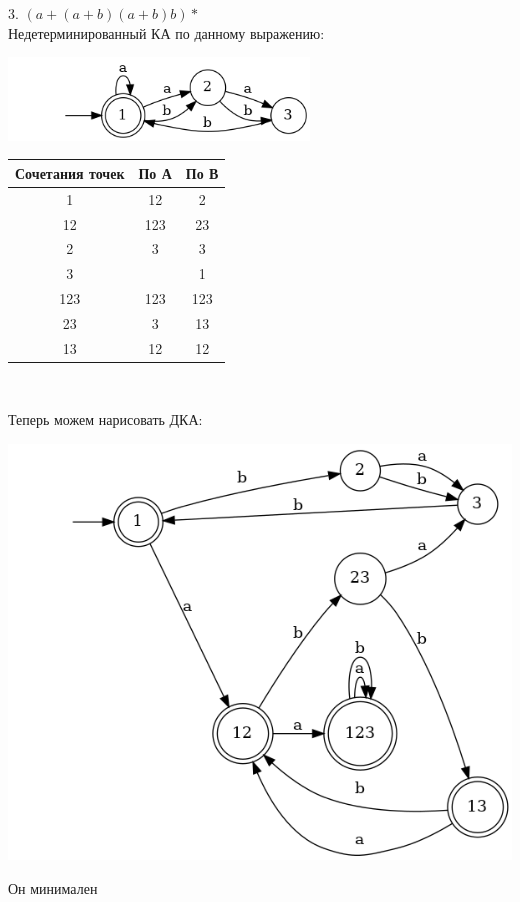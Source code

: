 \documentclass{article}
\begin{document}
    3. $(a+(a+b)(a+b)b)*$\\
    Недетерминированный КА по данному выражению:
    \begin{center}
        \includegraphics[width=0.6\textwidth]{pic3_3_1.dot}\\
    \end{center}
    \begin{center}
        \begin{tabular}{|c|c|c|}
            \hline
            Сочетания точек & По А & По В \\
            \hline
                1 & 12 & 2\\
                12 & 123 & 23\\
                2 & 3 & 3 \\
                3 &  & 1\\
                123 & 123 & 123 \\
                23 & 3 & 13 \\
                13 & 12 & 12 \\
            \hline
        \end{tabular}\\
    \end{center}
    Теперь можем нарисовать ДКА:
    \begin{center}
        \includegraphics[width=1\textwidth]{pic3_3_2.dot}\\
    \end{center}
    Он минимален
    
\end{document}
